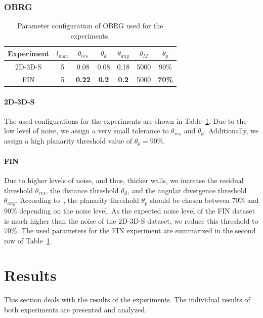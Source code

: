 \documentclass[main.tex]{subfiles}
\begin{document}
\subsubsection{OBRG}
\begin{table}[H]
    \centering
    \begin{tabular}{c|cccccc}
        Experiment & $l_{max}$ & $\theta_{res}$ & $\theta_{d}$ & $\theta_{ang}$ & $\theta_M$ & $\theta_p$    \\ \hline
        2D-3D-S    & 5         & 0.08           & 0.08         & 0.18           & 5000       & 90\%          \\
        FIN        & 5         & \textbf{0.22}  & \textbf{0.2} & \textbf{0.2}   & 5000       & \textbf{70\%}
    \end{tabular}
    \caption{Parameter configuration of OBRG used for the experiments.}
    \label{tab:obrg-param}
\end{table}


\paragraph{2D-3D-S}
The used configurations for the experiments are shown in Table~\ref{tab:obrg-param}.
Due to the low level of noise, we assign a very small tolerance to $\theta_{res}$ and $\theta_d$. Additionally, we assign a high
planarity threshold value of $\theta_p = 90\%$.

\paragraph{FIN}
Due to higher levels of noise, and thus, thicker walls, we increase the residual threshold $\theta_{res}$, the distance
threshold $\theta_d$, and the angular divergence threshold $\theta_{ang}$. According to~\cite[Section~3.4]{Vo_Truong-Hong_Laefer_Bertolotto_2015},
the planarity threshold $\theta_p$ should be chosen between 70\% and 90\% depending on the noise level. As the expected noise level of the
FIN dataset is much higher than the noise of the 2D-3D-S dataset, we reduce this threshold to 70\%.
The used parameters for the FIN experiment are summarized in the second row of Table~\ref{tab:obrg-param}.


\section{Results}
This section deals with the results of the experiments. The individual results of both experiments are presented and analyzed.
\end{document}
